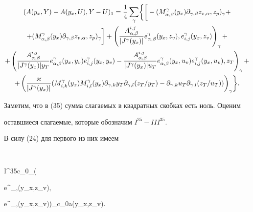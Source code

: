 \begin{gather} 


(A(y_x,Y)-A(y_x,U),Y-U)_1=\frac14\sum_\gamma \biggl\{ \biggr[ 


 -(M^\gamma_{\alpha,\beta}(y_x)\partial_{\gamma,\beta} 


z_{v,\alpha},z_p)_\gamma+ \notag\\ 


+(M^\gamma_{\alpha,\beta}(y_x)\partial_{\gamma,\beta}z_{v,\alpha}, 


z_p)_\gamma \biggr] + 


 \left( \frac{A^{i,j}_{\alpha,\beta}}{|J^\gamma(y_x)|} 


 e^\gamma_{\alpha,\beta}(y_x,z_v),e^\gamma_{i,j}(y_x,z_v)\right)_\gamma 


 + \notag \\ 


+\left( 


\frac{A^{i,j}_{\alpha,\beta}}{|J^\gamma(y_x)|y_T} 


e^\gamma_{\alpha,\beta}(y_x,y_v)e^\gamma_{i,j}(y_x,y_v)-  


\frac{A^{i,j}_{\alpha,\beta}}{|J^\gamma(y_x)|u_T} 


e^\gamma_{\alpha,\beta}(y_x,u_v)e^\gamma_{i,j}(y_x,u_v),z_T\right)_\gamma 


 +\notag\\


+\left(\frac{\varkappa}{|J^\gamma(y_x)|} 


 (M^\gamma_{i,k}(y_x)M^\gamma_{i,l}(y_x)\partial_{\gamma,k} 


 y_T\partial_{\gamma,l}(z_T/y_T)-\partial_{\gamma,k}u_T 


 \partial_{\gamma,l}(z_T/u_T))\right)_\gamma\biggr\}.


\end{gather} 


Заметим, что в (35) сумма слагаемых в квадратных скобках есть ноль. Оценим 


оставшиеся слагаемые, которые обозначим $I^{35}-III^{35}.$ 


 


В силу (24) для первого из них имеем 


$$ 


I^{35}\ge c_0\sum_\gamma\left( 


 e^\gamma_{\alpha,\beta}(y_x,z_v), 


 e^\gamma_{\alpha,\beta}(y_x,z_v)\right)_\gamma\equiv c_0a(y_x,z_v). 


